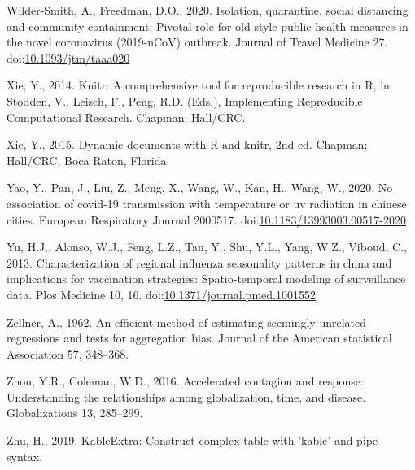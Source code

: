 \documentclass[]{elsarticle} %
\begin{document}
\leavevmode\hypertarget{ref-Wilder2020isolation}{}%
Wilder-Smith, A., Freedman, D.O., 2020. Isolation, quarantine, social
distancing and community containment: Pivotal role for old-style public
health measures in the novel coronavirus (2019-nCoV) outbreak. Journal
of Travel Medicine 27.
doi:\href{https://doi.org/10.1093/jtm/taaa020}{10.1093/jtm/taaa020}

\leavevmode\hypertarget{ref-Xie2014}{}%
Xie, Y., 2014. Knitr: A comprehensive tool for reproducible research in
R, in: Stodden, V., Leisch, F., Peng, R.D. (Eds.), Implementing
Reproducible Computational Research. Chapman; Hall/CRC.

\leavevmode\hypertarget{ref-Xie2015}{}%
Xie, Y., 2015. Dynamic documents with R and knitr, 2nd ed. Chapman;
Hall/CRC, Boca Raton, Florida.

\leavevmode\hypertarget{ref-Yao2020association}{}%
Yao, Y., Pan, J., Liu, Z., Meng, X., Wang, W., Kan, H., Wang, W., 2020.
No association of covid-19 transmission with temperature or uv radiation
in chinese cities. European Respiratory Journal 2000517.
doi:\href{https://doi.org/10.1183/13993003.00517-2020}{10.1183/13993003.00517-2020}

\leavevmode\hypertarget{ref-Yu2013characterization}{}%
Yu, H.J., Alonso, W.J., Feng, L.Z., Tan, Y., Shu, Y.L., Yang, W.Z.,
Viboud, C., 2013. Characterization of regional influenza seasonality
patterns in china and implications for vaccination strategies:
Spatio-temporal modeling of surveillance data. Plos Medicine 10, 16.
doi:\href{https://doi.org/10.1371/journal.pmed.1001552}{10.1371/journal.pmed.1001552}

\leavevmode\hypertarget{ref-Zellner1962efficient}{}%
Zellner, A., 1962. An efficient method of estimating seemingly unrelated
regressions and tests for aggregation bias. Journal of the American
statistical Association 57, 348--368.

\leavevmode\hypertarget{ref-Zhou2016accelerated}{}%
Zhou, Y.R., Coleman, W.D., 2016. Accelerated contagion and response:
Understanding the relationships among globalization, time, and disease.
Globalizations 13, 285--299.

\leavevmode\hypertarget{ref-Zhu2019}{}%
Zhu, H., 2019. KableExtra: Construct complex table with 'kable' and pipe
syntax.
\end{document}
